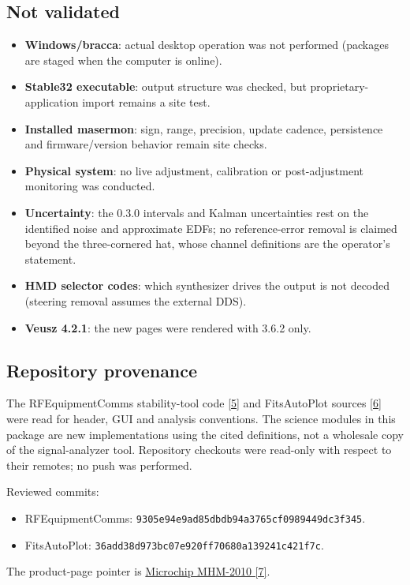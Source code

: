 \documentclass[11pt,a4paper]{article}
\renewcommand{\_}{\usscore\allowbreak}
\begin{document}
\subsection{Not validated}
\begin{itemize}
\item \textbf{Windows/bracca}: actual desktop operation was not performed (packages are staged when the computer is online).
\item \textbf{Stable32 executable}: output structure was checked, but proprietary-application import remains a site test.
\item \textbf{Installed masermon}: sign, range, precision, update cadence, persistence and firmware/version behavior remain site checks.
\item \textbf{Physical system}: no live adjustment, calibration or post-adjustment monitoring was conducted.
\item \textbf{Uncertainty}: the 0.3.0 intervals and Kalman uncertainties rest on the identified noise and
approximate EDFs; no reference-error removal is claimed beyond the three-cornered hat, whose channel
definitions are the operator's statement.
\item \textbf{HMD selector codes}: which synthesizer drives the output is not decoded (steering removal assumes the external DDS).
\item \textbf{Veusz 4.2.1}: the new pages were rendered with 3.6.2 only.
\end{itemize}

\subsection{Repository provenance}
The RF\_Equipment\_Comms stability-tool code
\href{https://github.com/Braveheart53/RF_Equipment_Comms/tree/main/sa_stability_tool}{[5]}
and FitsAutoPlot sources \href{https://github.com/Braveheart53/FitsAutoPlot}{[6]}
were read for header, GUI and analysis conventions. The science modules in this package
are new implementations using the cited definitions, not a wholesale copy of
the signal-analyzer tool. Repository checkouts were read-only with respect
to their remotes; no push was performed.

Reviewed commits:
\begin{itemize}
\item RF\_Equipment\_Comms: \texttt{9305e94e9ad85dbdb94a3765cf0989449dc3f345}.
\item FitsAutoPlot: \texttt{36add38d973bc07e920ff70680a139241c421f7c}.
\end{itemize}
The product-page pointer is
\href{https://www.microchip.com/en-us/product/mhm-2010}{Microchip MHM-2010 [7]}.
\clearpage
\end{document}
